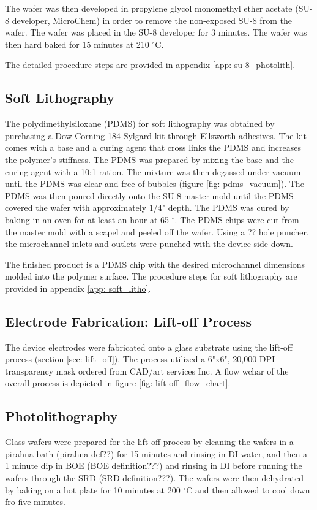 \par The wafer was then developed in propylene glycol monomethyl ether acetate (SU-8 developer, MicroChem) in order to remove the non-exposed SU-8 from the wafer. The wafer was placed in the SU-8 developer for 3 minutes. The wafer was then hard baked for 15 minutes at 210 $^\circ$C. 

The detailed procedure steps are provided in appendix \ref{app: su-8_photolith}.

\subsection*{Soft Lithography}
\par The polydimethylsiloxane (PDMS) for soft lithography was obtained by purchasing a Dow Corning 184 Sylgard kit through Ellsworth adhesives. The kit comes with a base and a curing agent that cross links the PDMS and increases the polymer's stiffness. The PDMS was prepared by mixing the base and the curing agent with a 10:1 ration. The mixture was then degassed under vacuum until the PDMS was clear and free of bubbles (figure \ref{fig: pdms_vacuum}). The PDMS was then poured directly onto the SU-8 master mold until the PDMS covered the wafer with approximately 1/4" depth. The PDMS was cured by baking in an oven for at least an hour at 65 $^\circ$. The PDMS chips were cut from the master mold with a scapel and peeled off the wafer. Using a ?? hole puncher, the microchannel inlets and outlets were punched with the device side down. 

\par The finished product is a PDMS chip with the desired microchannel dimensions molded into the polymer surface. The procedure steps for soft lithography are provided in appendix \ref{app: soft_litho}.


\subsection{Electrode Fabrication: Lift-off Process}
\par The device electrodes were fabricated onto a glass substrate using the lift-off process (section \ref{sec: lift_off}). The process utilized a 6"x6", 20,000 DPI transparency mask ordered from CAD/art services Inc. A flow wchar of the overall process is depicted in figure \ref{fig: lift-off_flow_chart}.

\subsection*{Photolithography}
\par Glass wafers were prepared for the lift-off process by cleaning the wafers in a pirahna bath (pirahna def??) for 15 minutes and rinsing in DI water, and then a 1 minute dip in BOE (BOE definition???) and rinsing in DI before running the wafers through the SRD (SRD definition???). The wafers were then dehydrated by baking on a hot plate for 10 minutes at 200 $^\circ$C and then allowed to cool down fro five minutes. 

